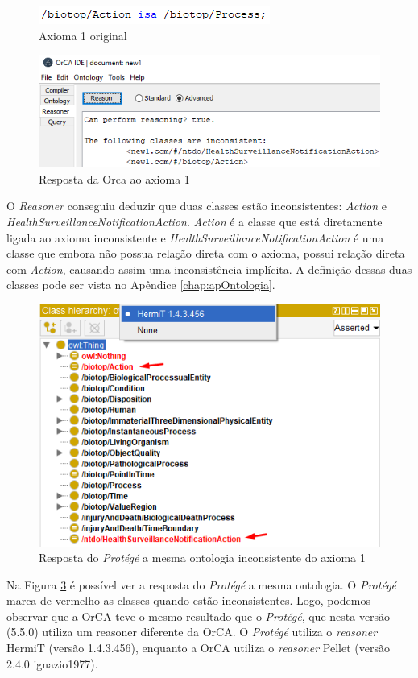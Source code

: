 \documentclass{bcc}
\begin{document}
\begin{figure}[H]
\centering
\includegraphics[width=.5\textwidth]{Figuras/axiomai_1_o.png}
\caption{Axioma 1 original} 
\label{fig:axiomai_1_o}
\end{figure}

\begin{figure}[H]
\centering
\includegraphics[width=.6\textwidth]{Figuras/axiomai_1_res.png}
\caption{Resposta da Orca ao axioma 1} 
\label{fig:axiomai_1_res}
\end{figure}

O \textit{Reasoner} conseguiu deduzir que duas classes estão inconsistentes: \textit{Action} e \textit{HealthSurveillanceNotificationAction}. \textit{Action} é a classe que está diretamente ligada ao axioma inconsistente e \textit{HealthSurveillanceNotificationAction} é uma classe que embora não possua relação direta com o axioma, possui relação direta com \textit{Action}, causando assim uma inconsistência implícita. A definição dessas duas classes pode ser vista no Apêndice \ref{chap:apOntologia}.

\begin{figure}[H]
\centering
\includegraphics[width=.6\textwidth]{Figuras/axiomai_1_protege.png}
\caption{Resposta do \textit{Protégé} a mesma ontologia inconsistente do axioma 1} 
\label{fig:axiomai_1_protege}
\end{figure}

Na Figura \ref{fig:axiomai_1_protege} é possível ver a resposta do \textit{Protégé} a mesma ontologia. O \textit{Protégé} marca de vermelho as classes quando estão inconsistentes. Logo, podemos observar que a OrCA teve o mesmo resultado que o \textit{Protégé}, que nesta versão (5.5.0) utiliza um reasoner diferente da OrCA. O \textit{Protégé} utiliza o \textit{reasoner} HermiT (versão 1.4.3.456), enquanto a OrCA utiliza o \textit{reasoner} Pellet (versão 2.4.0 ignazio1977).
\end{document}

